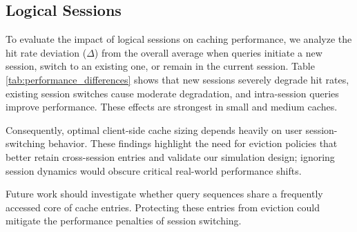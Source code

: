 \subsection{Logical Sessions}
To evaluate the impact of logical sessions on caching performance, 
we analyze the hit rate deviation ($\Delta$) from the overall average when queries initiate a new session, 
switch to an existing one, or remain in the current session.
Table \ref{tab:performance_differences} shows that new sessions severely degrade hit rates,
existing session switches cause moderate degradation, and intra-session queries improve performance.
These effects are strongest in small and medium caches.

Consequently, optimal client-side cache sizing depends heavily on user session-switching behavior.
These findings highlight the need for eviction policies that better retain cross-session entries
and validate our simulation design;
ignoring session dynamics would obscure critical real-world performance shifts.

Future work should investigate whether query sequences share a frequently accessed core of cache entries.
Protecting these entries from eviction could mitigate the performance penalties of session switching.

